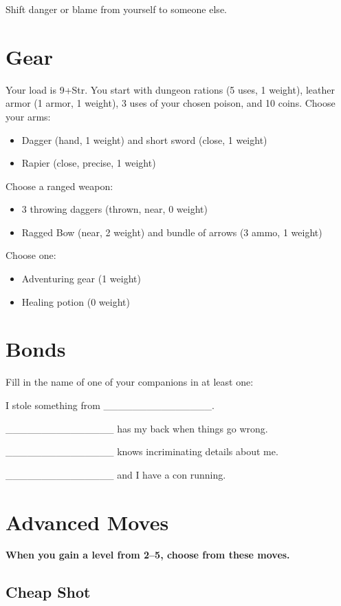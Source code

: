 Shift danger or blame from yourself to someone else.
\section*{Gear}

Your load is 9+Str. You start with dungeon rations (5 uses, 1 weight), leather armor (1 armor, 1 weight), 3 uses of your chosen poison, and 10 coins. Choose your arms:
\begin{itemize}
\item Dagger (hand, 1 weight) and short sword (close, 1 weight)
\item Rapier (close, precise, 1 weight)

\end{itemize}

Choose a ranged weapon:
\begin{itemize}
\item 3 throwing daggers (thrown, near, 0 weight)
\item Ragged Bow (near, 2 weight) and bundle of arrows (3 ammo, 1 weight)

\end{itemize}

Choose one:
\begin{itemize}
\item Adventuring gear (1 weight)
\item Healing potion (0 weight)

\end{itemize}
\section*{Bonds}

Fill in the name of one of your companions in at least one:

I stole something from \_\_\_\_\_\_\_\_\_\_\_\_\_\_\_.

\_\_\_\_\_\_\_\_\_\_\_\_\_\_\_ has my back when things go wrong.

\_\_\_\_\_\_\_\_\_\_\_\_\_\_\_ knows incriminating details about me.

\_\_\_\_\_\_\_\_\_\_\_\_\_\_\_ and I have a con running.
\section*{Advanced Moves}

{\bfseries When you gain a level from 2--5, choose from these moves.}
\subsection{Cheap Shot}

